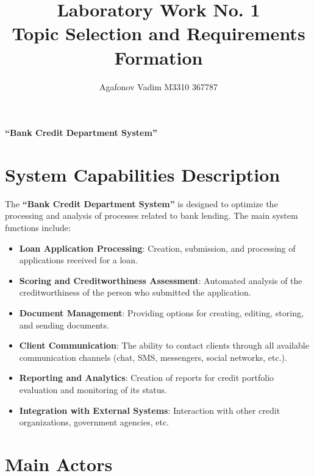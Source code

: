 \documentclass[20pt]{article}
\begin{document}
\pagestyle{empty}
\normalsize

\title{Laboratory Work No. 1 \\
Topic Selection and Requirements Formation}
\author{Agafonov Vadim M3310 367787}
\date{}
\maketitle

\centerline{\LARGE\textbf{“Bank Credit Department System”}}

\section{System Capabilities Description}

The \textbf{“Bank Credit Department System”} is designed to optimize the processing and analysis of processes related to bank lending. The main system functions include:

\begin{itemize}
    \item \textbf{Loan Application Processing}: Creation, submission, and processing of applications received for a loan.
    \item \textbf{Scoring and Creditworthiness Assessment}: Automated analysis of the creditworthiness of the person who submitted the application.
    \item \textbf{Document Management}: Providing options for creating, editing, storing, and sending documents.
    \item \textbf{Client Communication}: The ability to contact clients through all available communication channels (chat, SMS, messengers, social networks, etc.).
    \item \textbf{Reporting and Analytics}: Creation of reports for credit portfolio evaluation and monitoring of its status.
    \item \textbf{Integration with External Systems}: Interaction with other credit organizations, government agencies, etc.
\end{itemize}

\section{Main Actors}
\end{document}
